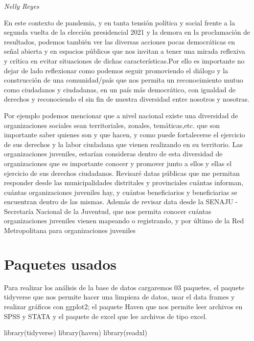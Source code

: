 \documentclass[
]{book}
\newenvironment{Shaded}{\begin{snugshade}}{\end{snugshade}}
\newcommand{\FunctionTok}[1]{\textcolor[rgb]{0.00,0.00,0.00}{#1}}
\newcommand{\NormalTok}[1]{#1}
\begin{document}
\emph{Nelly Reyes}

En este contexto de pandemia, y en tanta tensión política y social frente a la segunda vuelta de la elección presidencial 2021 y la demora en la proclamación de resultados, podemos también ver las diversas acciones pocas democráticas en señal abierta y en espacios públicos que nos invitan a tener una mirada reflexiva y crítica en evitar situaciones de dichas características.Por ello es importante no dejar de lado reflexionar como podemos seguir promoviendo el diálogo y la construcción de una comunidad/país que nos permita un reconocimiento mutuo como ciudadanos y ciudadanas, en un país más democrático, con igualdad de derechos y reconociendo el sin fin de nuestra diversidad entre nosotros y nosotras.

Por ejemplo podemos mencionar que a nivel nacional existe una diversidad de organizaciones sociales sean territoriales, zonales, temáticas,etc. que son importante saber quienes son y que hacen, y como puede fortalecerse el ejercicio de sus derechos y la labor ciudadana que vienen realizando en su territorio. Las organizaciones juveniles, estarían consideras dentro de esta diversidad de organizaciones que es importante conocer y promover junto a ellos y ellas el ejercicio de sus derechos ciudadanos. Revisaré datas públicas que me permitan responder desde las municipalidades distritales y provinciales cuántas informan, cuántas organizaciones juveniles hay, y cuántos beneficiarios y beneficiarias se encuentran dentro de las mismas. Además de revisar data desde la SENAJU - Secretaría Nacional de la Juventud, que nos permita conocer cuántas organizaciones juveniles vienen mapeando o registrando, y por último de la Red Metropolitana para organizaciones juveniles

\hypertarget{paquetes-usados-4}{%
\section{Paquetes usados}\label{paquetes-usados-4}}

Para realizar los análisis de la base de datos cargaremos 03 paquetes, el paquete tidyverse que nos permite hacer una limpieza de datos, usar el data frames y realizar gráficos con ggplot2; el paquete Haven que nos permite leer archivos en SPSS y STATA y el paquete de excel que lee archivos de tipo excel.

\begin{Shaded}
\begin{Highlighting}[]
\FunctionTok{library}\NormalTok{(tidyverse)}
\FunctionTok{library}\NormalTok{(haven)}
\FunctionTok{library}\NormalTok{(readxl)}
\end{Highlighting}
\end{Shaded}
\end{document}
